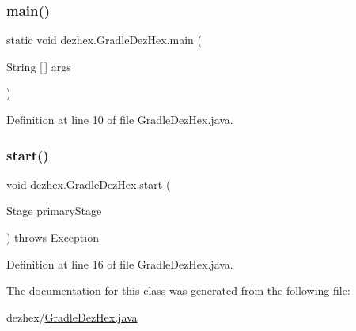 \subsubsection{\texorpdfstring{main()}{main()}}
{\footnotesize\ttfamily static void dezhex.\+Gradle\+Dez\+Hex.\+main (\begin{DoxyParamCaption}\item[{String \mbox{[}$\,$\mbox{]}}]{args }\end{DoxyParamCaption})\hspace{0.3cm}{\ttfamily [static]}}



Definition at line 10 of file Gradle\+Dez\+Hex.\+java.

\mbox{\label{classdezhex_1_1_gradle_dez_hex_ae0b72fc8103dca55356650ac085d2c7e}} 
\subsubsection{\texorpdfstring{start()}{start()}}
{\footnotesize\ttfamily void dezhex.\+Gradle\+Dez\+Hex.\+start (\begin{DoxyParamCaption}\item[{Stage}]{primary\+Stage }\end{DoxyParamCaption}) throws Exception}



Definition at line 16 of file Gradle\+Dez\+Hex.\+java.



The documentation for this class was generated from the following file\+:\begin{DoxyCompactItemize}
\item 
dezhex/\hyperlink{_gradle_dez_hex_8java}{Gradle\+Dez\+Hex.\+java}\end{DoxyCompactItemize}
